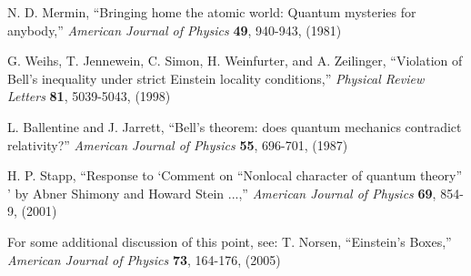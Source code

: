 \documentclass[aps,prc,onecolumn,12pt,nofootinbib]{revtex4-2}
\begin{document}
\begin{thebibliography}{00}
  N. D. Mermin, ``Bringing home the atomic
  world: Quantum mysteries for anybody,'' \emph{American Journal of
  Physics} {\bf{49}}, 940-943, (1981)

 G. Weihs, T. Jennewein, C. Simon, H. Weinfurter, and
  A. Zeilinger, ``Violation of Bell's inequality under strict Einstein
  locality conditions,'' \emph{Physical Review Letters} {\bf{81}},
  5039-5043, (1998)

 L. Ballentine and J. Jarrett, ``Bell's
  theorem: does quantum mechanics contradict relativity?''
  \emph{American Journal of Physics} {\bf{55}}, 696-701, (1987)

  H. P. Stapp, ``Response to `Comment on
  ``Nonlocal character of quantum theory'' ' by Abner Shimony and
  Howard Stein ...,'' \emph{American Journal of Physics} {\bf{69}},
  854-9, (2001)

 For some additional discussion of this point, see:
 T. Norsen, ``Einstein's Boxes,''
  \emph{American Journal of Physics} {\bf{73}}, 164-176, (2005)



\end{thebibliography}
\end{document}
